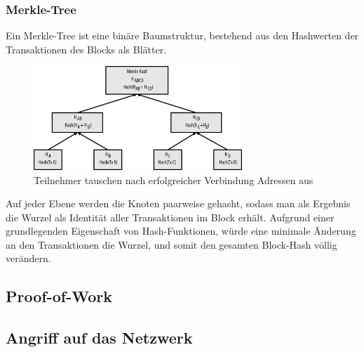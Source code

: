 \subsubsection{Merkle-Tree}
Ein Merkle-Tree ist eine binäre Baumstruktur, bestehend aus den Hashwerten der Transaktionen des Blocks als Blätter.
\begin{figure}[htpb]
	\centering
	\includegraphics[width=0.7\textwidth]{images/merkle.png}
	\caption{Teilnehmer tauschen nach erfolgreicher Verbindung Adressen aus}
	\label{6braun:fig:merkle}
\end{figure}
Auf jeder Ebene werden die Knoten paarweise gehasht, sodass man als Ergebnis die Wurzel als Identität aller Transaktionen im Block erhält. Aufgrund einer grundlegenden Eigenschaft von Hash-Funktionen, würde eine minimale Änderung an den Transaktionen die Wurzel, und somit den gesamten Block-Hash völlig verändern.
\subsection{Proof-of-Work}
\subsection{Angriff auf das Netzwerk}

